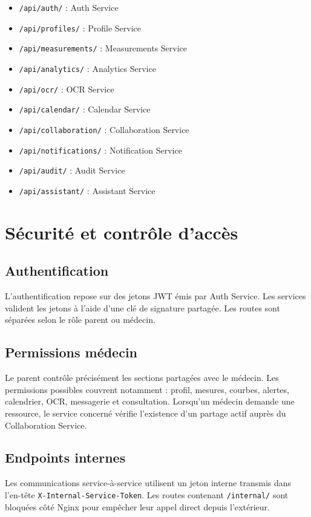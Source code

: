 \begin{itemize}
    \item \texttt{/api/auth/} : Auth Service
    \item \texttt{/api/profiles/} : Profile Service
    \item \texttt{/api/measurements/} : Measurements Service
    \item \texttt{/api/analytics/} : Analytics Service
    \item \texttt{/api/ocr/} : OCR Service
    \item \texttt{/api/calendar/} : Calendar Service
    \item \texttt{/api/collaboration/} : Collaboration Service
    \item \texttt{/api/notifications/} : Notification Service
    \item \texttt{/api/audit/} : Audit Service
    \item \texttt{/api/assistant/} : Assistant Service
\end{itemize}

\section{Sécurité et contrôle d'accès}

\subsection{Authentification}
L'authentification repose sur des jetons JWT émis par Auth Service. Les services valident les jetons à l'aide d'une clé de signature partagée. Les routes sont séparées selon le rôle parent ou médecin.

\subsection{Permissions médecin}
Le parent contrôle précisément les sections partagées avec le médecin. Les permissions possibles couvrent notamment : profil, mesures, courbes, alertes, calendrier, OCR, messagerie et consultation. Lorsqu'un médecin demande une ressource, le service concerné vérifie l'existence d'un partage actif auprès du Collaboration Service.

\subsection{Endpoints internes}
Les communications service-à-service utilisent un jeton interne transmis dans l'en-tête \texttt{X-Internal-Service-Token}. Les routes contenant \texttt{/internal/} sont bloquées côté Nginx pour empêcher leur appel direct depuis l'extérieur.


